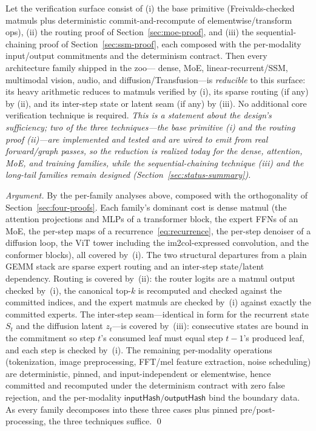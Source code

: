 \begin{theorem}
\label{thm:two-extensions}
Let the verification surface consist of (i) the base primitive (Freivalds-checked
matmuls plus deterministic commit-and-recompute of elementwise/transform ops), (ii) the
routing proof of Section~\ref{sec:moe-proof}, and (iii) the sequential-chaining proof of
Section~\ref{sec:ssm-proof}, each composed with the per-modality input/output commitments
and the determinism contract. Then every architecture family shipped in the \Zoo{} zoo---
dense, MoE, linear-recurrent/SSM, multimodal vision, audio, and diffusion/Transfusion---is
\emph{reducible} to this surface: its heavy arithmetic reduces to matmuls verified by (i),
its sparse routing (if
any) by (ii), and its inter-step state or latent seam (if any) by (iii). No additional
core verification technique is required. \emph{This is a statement about the design's
sufficiency; two of the three techniques---the base primitive (i) and the routing proof
(ii)---are implemented and tested and are wired to emit from real forward/graph passes, so
the reduction is realized today for the dense, attention, MoE, and training families, while
the sequential-chaining technique (iii) and the long-tail families remain designed
(Section~\ref{sec:status-summary}).}
\end{theorem}

\begin{proof}[Argument]
By the per-family analyses above, composed with the orthogonality of
Section~\ref{sec:four-proofs}. Each family's dominant cost is dense matmul (the attention
projections and MLPs of a transformer block, the expert FFNs of an MoE, the per-step maps
of a recurrence~\eqref{eq:recurrence}, the per-step denoiser of a diffusion loop, the ViT
tower including the im2col-expressed convolution, and the conformer blocks), all covered
by~(i). The two structural departures from a plain GEMM stack are sparse expert routing and
an inter-step state/latent dependency. Routing is covered by~(ii): the router logits are a
matmul output checked by~(i), the canonical top-$k$ is recomputed and checked against the
committed indices, and the expert matmuls are checked by~(i) against exactly the committed
experts. The inter-step seam---identical in form for the recurrent state $S_t$ and the
diffusion latent $z_t$---is covered by~(iii): consecutive states are bound in the
commitment so step $t$'s consumed leaf must equal step $t-1$'s produced leaf, and each step
is checked by~(i). The remaining per-modality operations (tokenization, image
preprocessing, FFT/mel feature extraction, noise scheduling) are deterministic, pinned, and
input-independent or elementwise, hence committed and recomputed under the determinism
contract with zero false rejection, and the per-modality $\mathsf{inputHash}/
\mathsf{outputHash}$ bind the boundary data. As every family decomposes into these three
cases plus pinned pre/post-processing, the three techniques suffice. \qed
\end{proof}

